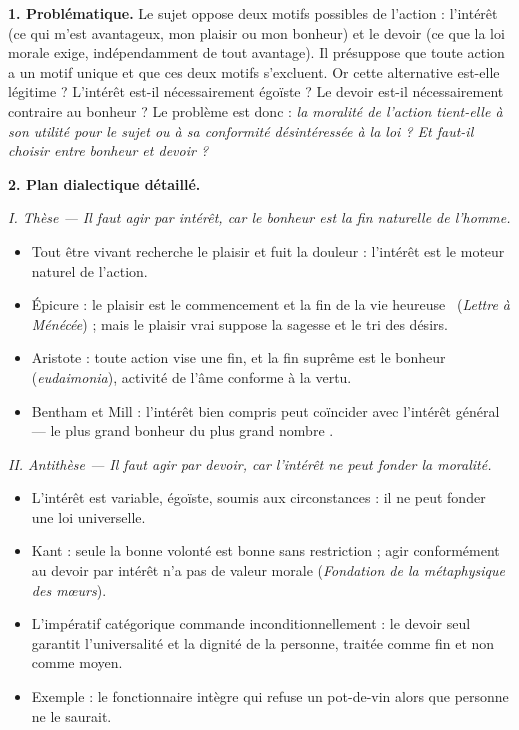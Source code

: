 \documentclass[11pt]{article}
\newcommand{\cle}[1]{{\popxbold\color{popdark}#1}}
\begin{document}
\begin{corrige}

\textbf{1. Problématique.} Le sujet oppose deux motifs possibles de l'action : l'\cle{intérêt} (ce qui m'est avantageux, mon plaisir ou mon bonheur) et le \cle{devoir} (ce que la loi morale exige, indépendamment de tout avantage). Il présuppose que toute action a un motif unique et que ces deux motifs s'excluent. Or cette alternative est-elle légitime ? L'intérêt est-il nécessairement égoïste ? Le devoir est-il nécessairement contraire au bonheur ? Le problème est donc : \emph{la moralité de l'action tient-elle à son utilité pour le sujet ou à sa conformité désintéressée à la loi ? Et faut-il choisir entre bonheur et devoir ?}

\textbf{2. Plan dialectique détaillé.}

\emph{I. Thèse — Il faut agir par intérêt, car le bonheur est la fin naturelle de l'homme.}
\begin{itemize}
\item Tout être vivant recherche le plaisir et fuit la douleur : l'intérêt est le moteur naturel de l'action.
\item Épicure : le plaisir est \guillemotleft le commencement et la fin de la vie heureuse \guillemotright\ (\emph{Lettre à Ménécée}) ; mais le plaisir vrai suppose la sagesse et le tri des désirs.
\item Aristote : toute action vise une fin, et la fin suprême est le bonheur (\emph{eudaimonia}), activité de l'âme conforme à la vertu.
\item Bentham et Mill : l'intérêt bien compris peut coïncider avec l'intérêt général — \guillemotleft le plus grand bonheur du plus grand nombre \guillemotright.
\end{itemize}

\emph{II. Antithèse — Il faut agir par devoir, car l'intérêt ne peut fonder la moralité.}
\begin{itemize}
\item L'intérêt est variable, égoïste, soumis aux circonstances : il ne peut fonder une loi universelle.
\item Kant : seule la bonne volonté est bonne sans restriction ; agir conformément au devoir par intérêt n'a pas de valeur morale (\emph{Fondation de la métaphysique des mœurs}).
\item L'impératif catégorique commande inconditionnellement : le devoir seul garantit l'universalité et la dignité de la personne, traitée comme fin et non comme moyen.
\item Exemple : le fonctionnaire intègre qui refuse un pot-de-vin alors que personne ne le saurait.
\end{itemize}


\end{corrige}
\end{document}
